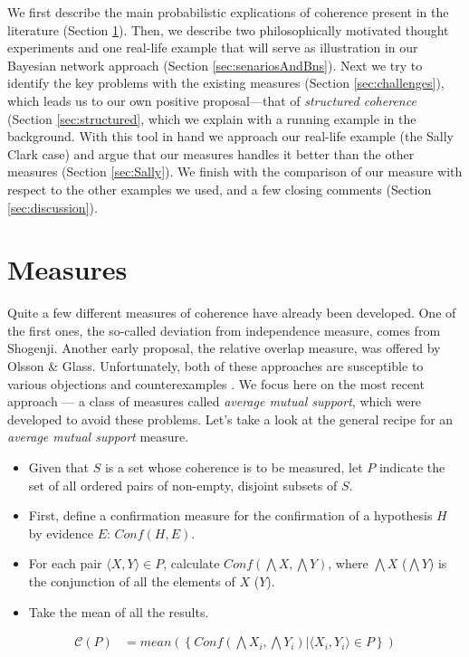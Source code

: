 \documentclass[10pt,]{scrartcl}
\begin{document}
We first describe the main probabilistic explications of coherence present in the literature (Section \ref{sec:measures}). Then, we describe two philosophically motivated thought experiments and one real-life example that will serve as illustration in our Bayesian network approach (Section \ref{sec:senariosAndBns}). Next we try to identify the key problems with  the existing measures (Section \ref{sec:challenges}), which leads us to our own positive proposal---that of \emph{structured coherence} (Section \ref{sec:structured}, which we explain with a running example in the background. With this tool in hand we approach our real-life example (the Sally Clark case) and argue that our measures handles it better than the other measures (Section \ref{sec:Sally}). We finish with the comparison of our measure with respect to the other examples we used, and a few closing comments (Section \ref{sec:discussion}). 





\section{Measures}\label{sec:measures}

Quite a few different measures of coherence have already been developed. One of the first ones, the so-called deviation from independence measure, comes from Shogenji. Another early proposal, the relative overlap measure, was offered by  Olsson \& Glass. 
Unfortunately, both of these approaches are susceptible to various objections and counterexamples \citep{Merricks1995,shogenji1999conducive, Akiba2000Shogenjis, Shogenji2001Reply, bovens2004bayesian,Siebel2004On-Fitelsons-me,siebel2006against,Shogenji2006Why,crupi2007BayesianMeasuresEvidential, koscholke2016evaluating, Schippers2019General}.
 We focus here on the most recent approach --- a class of measures called
\textit{average mutual support}, which were developed to avoid these problems. Let’s take a look at  the general recipe for an \textit{average mutual support} measure.


\begin{itemize}
\item
  Given that \(S\) is a set whose coherence is to be measured, let \(P\)
  indicate the set of all ordered pairs of non-empty, disjoint subsets
  of \(S\).
\item
  First, define a confirmation measure for the confirmation of a hypothesis \(H\) by evidence  \(E\): \(Conf(H,E)\).
\item
  For each pair \(\langle X, Y \rangle \in P\), calculate
  \(Conf(\bigwedge X, \bigwedge Y)\), where $\bigwedge X$ ($\bigwedge Y$) is the conjunction of all the elements of $X$ ($Y$).
\item
  Take the mean of all the results.
\end{itemize}\begin{align*}
    \mathcal{C}(P) & =
mean\left(\left\{Conf(\bigwedge X_i, \bigwedge Y_i) | \langle X_i, Y_i \rangle \in P\right\} \right)
\end{align*}
\end{document}
